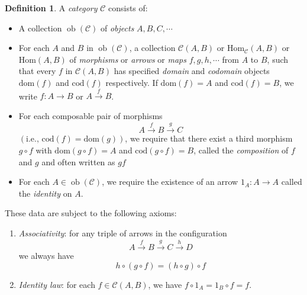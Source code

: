 \documentclass[10pt,oneside]{book}
\def\~#1{\mathscr{#1}}
\def\To#1{\xrightarrow{#1}}
\newcommand{\dom}{\mathrm{dom}}
\newcommand{\ob}{\mathop{\mathrm{ob}}}
\newcommand{\cod}{\mathrm{cod}}
\newcommand{\Hom}{\mathrm{Hom}}
\theoremstyle{plain}
\theoremstyle{definition}
\newtheorem{defn}[thm]{Definition}
\theoremstyle{remark}
\numberwithin{equation}{section}
\numberwithin{figure}{section}
\begin{document}
\begin{defn}
    A \emph{category} $\~{C}$ consists of:
    \begin{itemize}
        \item A collection $\ob (\~{C})$ of \emph{objects} $A, B, C, \cdots$
        
        \item For each $A$ and $B$ in $\ob (\~{C})$, a collection $\~C(A, B)$ or $\Hom_\~{C} (A, B)$ or $\Hom (A,B)$ of \emph{morphisms} or \emph{arrows} or \emph{maps} $f, g, h, \cdots$ from $A$ to $B$, such that every $f$ in $\~C(A, B)$ has specified \emph{domain} and \emph{codomain} objects $\dom(f)$ and $\cod(f)$ respectively. If $\dom(f) = A$ and $\cod(f) = B$, we write $f: A \to B$ or $A \To{f} B$.
        
        \item For each composable pair of morphisms  
        \[A \To{f} B \To{g} C\]
        $(\text{i.e., } \cod(f) = \dom(g))$, we require that there exist a third morphism $g \circ f$ with $\dom(g \circ f) = A$ and $\cod(g \circ f) = B$, called the \emph{composition} of $f$ and $g$ and often written as $gf$
        
        \item For each $A \in \ob (\~{C})$, we require the existence of an arrow $1_A: A \to A$ called the \emph{identity} on $A$.
    \end{itemize}
    These data are subject to the following axioms:
    \begin{enumerate}[label=(\roman*)]
        \item \emph{Associativity}: for any triple of arrows in the configuration 
        \[A \xrightarrow{f} B \xrightarrow{g} C \xrightarrow{h} D\]
        we always have 
        \[h \circ( g \circ f) = (h \circ g) \circ f\]
        \item \emph{Identity law}: for each $f \in \~C (A, B)$, we have $f \circ 1_A = 1_B \circ f = f$.
    \end{enumerate}
\end{defn}
\end{document}

